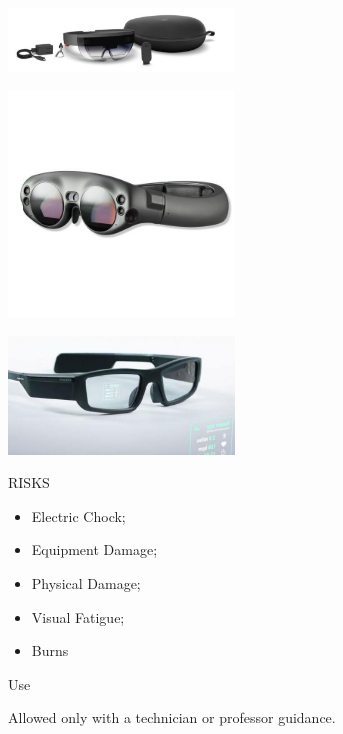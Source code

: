 \begin{multicols}{2}

\includegraphics[width=60mm, keepaspectratio]{imgs/hololens.jpg}

\includegraphics[width=60mm, keepaspectratio]{imgs/magicleap.jpg}

\includegraphics[width=60mm, keepaspectratio]{imgs/vuzix.jpg}

\columnbreak

\begin{mdframed}[roundcorner=10pt, linecolor=red, linewidth=2pt]
\vspace{1em}
{\Large {\color{red}RISKS}}
\vspace{1em}

\begin{itemize}
    \item Electric Chock;
    \item Equipment Damage;
    \item Physical Damage;
    \item Visual Fatigue;
    \item Burns
\end{itemize}

\vspace{1em}
\end{mdframed}

\vspace{2em}

{\Large Use}
\vspace{1em}

Allowed only with a technician or professor guidance.
\end{multicols}


